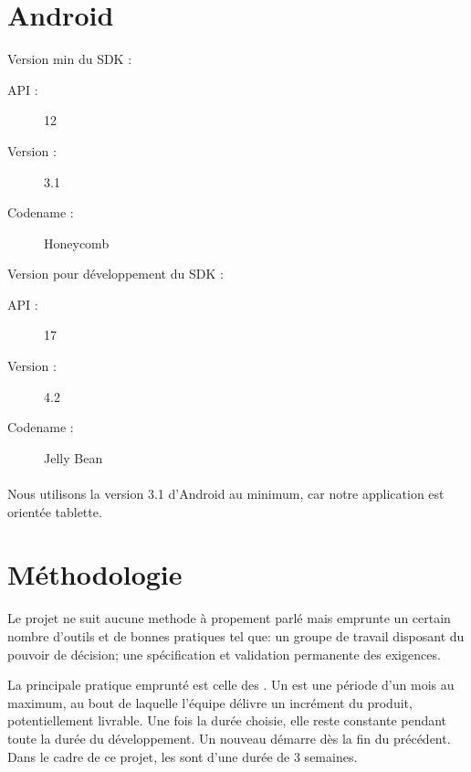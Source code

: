 \section{Android}
Version min du SDK :
\begin{description}
\item[API : ] 12
\item[Version : ] 3.1 
\item[Codename : ] Honeycomb 
\end{description}

Version pour développement du SDK :
\begin{description}
\item[API : ] 17
\item[Version : ] 4.2 
\item[Codename : ] Jelly Bean
\end{description}

\paragraph{}Nous utilisons la version 3.1 d'Android au minimum, car notre application est orientée tablette.
\section{Méthodologie}
Le projet ne suit aucune methode \agile{} à propement parlé mais emprunte un certain nombre d'outils et de \og{}bonnes pratiques\fg{} tel que: un \og{}groupe de travail disposant du pouvoir de décision\fg{}; une \og{}spécification et validation permanente des exigences\fg{}.

La principale pratique emprunté est celle des \sprint{}. Un \sprint{} est une période d'un mois au maximum, au bout de laquelle l'équipe délivre un incrément du produit, potentiellement livrable. Une fois la durée choisie, elle reste constante pendant toute la durée du développement. Un nouveau \sprint{} démarre dès la fin du précédent. Dans le cadre de ce projet, les \sprint{} sont d'une durée de 3 semaines.
